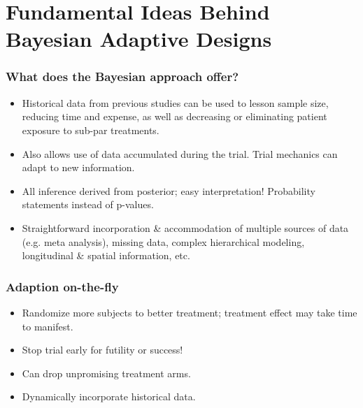 \documentclass{beamer}
\begin{document}
\section{Fundamental Ideas Behind Bayesian Adaptive Designs} %


\begin{frame}
\frametitle{What does the Bayesian approach offer?}
\begin{itemize}
\item Historical data from previous studies can be used to lesson sample size, reducing time and expense, as well as decreasing or eliminating patient exposure to sub-par treatments.
\item Also allows use of data accumulated during the trial.  Trial mechanics can adapt to new information.
\item All inference derived from posterior; easy interpretation! Probability statements instead of p-values.
\item Straightforward incorporation \& accommodation of multiple sources of data (e.g. meta analysis), missing data, complex hierarchical modeling, longitudinal \& spatial information, etc. 
\end{itemize}

\end{frame}



\begin{frame}
\frametitle{Adaption on-the-fly}
\begin{itemize}
\item Randomize more subjects to better treatment; treatment effect may take time to manifest.
\item Stop trial early for futility or success!
\item Can drop unpromising treatment arms.
\item Dynamically incorporate historical data.
\end{itemize}
\end{frame}
\end{document}
